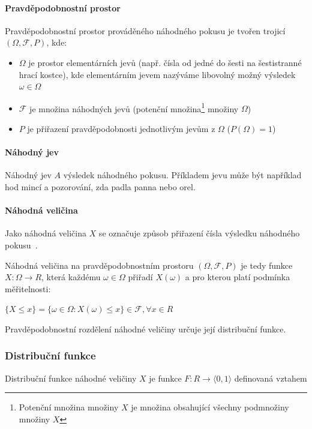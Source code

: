 \documentclass[thesis=M,czech]{FITthesis}[2014/05/07]
\begin{document}
\paragraph{Pravděpodobnostní prostor}

Pravděpodobnostní prostor prováděného náhodného pokusu je tvořen trojicí $(\Omega,\mathcal{F},P)$, kde:
	\begin{itemize}
		\item $\Omega$ je prostor elementárních jevů (např. čísla od jedné do šesti na šestistranné hrací kostce), kde elementárním jevem nazýváme libovolný možný výsledek $\omega \in \Omega$ 
		\item $\mathcal{F}$ je množina náhodných jevů (potenční množina\footnote{Potenční množina množiny $X$ je množina obsahující všechny podmnožiny množiny $X$} množiny $\Omega$)
		\item $P$ je přiřazení pravděpodobnosti jednotlivým jevům z $\Omega$ ($P(\Omega)=1$)
	\end{itemize}

\paragraph{Náhodný jev}
	
Náhodný jev $A$ výsledek náhodného pokusu. Příkladem jevu může být například hod mincí a pozorování, zda padla panna nebo orel.

\paragraph{Náhodná veličina}
	\label{randomvel}
Jako náhodná veličina $X$ se označuje způsob přiřazení čísla výsledku náhodného pokusu~\cite{pst1}. 

Náhodná veličina na pravděpodobnostním prostoru $(\Omega,\mathcal{F},P)$ je tedy funkce $X: \Omega \to R$, která každému $\omega \in \Omega$ přiřadí $X(\omega)$ a pro kterou platí podmínka měřitelnosti:

\begin{center}
$\{ X \leq x \} = \{ \omega \in \Omega: X(\omega) \leq x \} \in \mathcal{F}, \forall x \in R$
\end{center}

Pravděpodobnostní rozdělení náhodné veličiny určuje její distribuční funkce. 

\subsubsection{Distribuční funkce}
\label{cdf}
Distribuční funkce náhodné veličiny $X$ je funkce $F: R \to \langle0,1\rangle$ definovaná vztahem 
\end{document}
